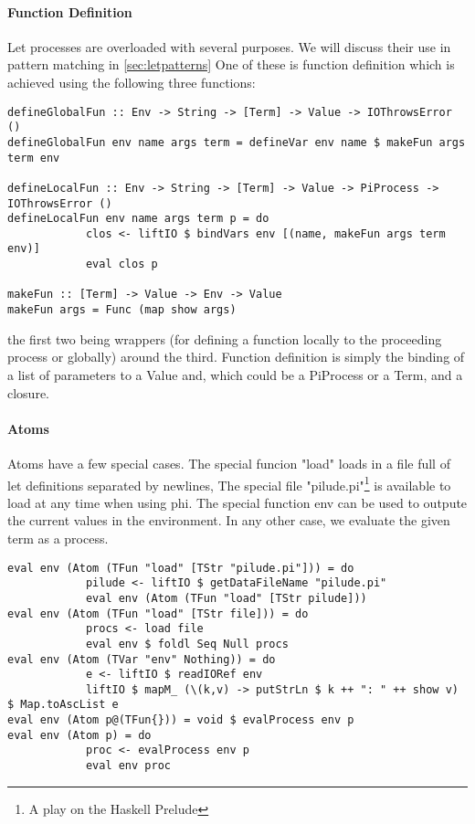 \paragraph{Function Definition}
Let processes are overloaded with several purposes. We will discuss their use in pattern matching in \ref{sec:letpatterns} One of these is function definition which is achieved using the following three functions:
\begin{verbatim}
defineGlobalFun :: Env -> String -> [Term] -> Value -> IOThrowsError ()
defineGlobalFun env name args term = defineVar env name $ makeFun args term env

defineLocalFun :: Env -> String -> [Term] -> Value -> PiProcess -> IOThrowsError ()
defineLocalFun env name args term p = do
            clos <- liftIO $ bindVars env [(name, makeFun args term env)]
            eval clos p

makeFun :: [Term] -> Value -> Env -> Value
makeFun args = Func (map show args)
\end{verbatim}
the first two being wrappers (for defining a function locally to the proceeding process or globally) around the third. Function definition is simply the binding of a list of parameters to a Value and, which could be a PiProcess or a Term, and a closure.

\paragraph{Atoms}
Atoms have a few special cases. The special funcion "load" loads in a file full of let definitions separated by newlines,
The special file "pilude.pi"\footnote{A play on the Haskell Prelude} is available to load at any time when using phi. The special function env can be used to outpute the current values in the environment. In any other case, we evaluate the given term as a process.
\begin{verbatim}
eval env (Atom (TFun "load" [TStr "pilude.pi"])) = do
            pilude <- liftIO $ getDataFileName "pilude.pi"
            eval env (Atom (TFun "load" [TStr pilude]))
eval env (Atom (TFun "load" [TStr file])) = do
            procs <- load file  
            eval env $ foldl Seq Null procs
eval env (Atom (TVar "env" Nothing)) = do
            e <- liftIO $ readIORef env
            liftIO $ mapM_ (\(k,v) -> putStrLn $ k ++ ": " ++ show v) $ Map.toAscList e
eval env (Atom p@(TFun{})) = void $ evalProcess env p
eval env (Atom p) = do
            proc <- evalProcess env p
            eval env proc
\end{verbatim}

